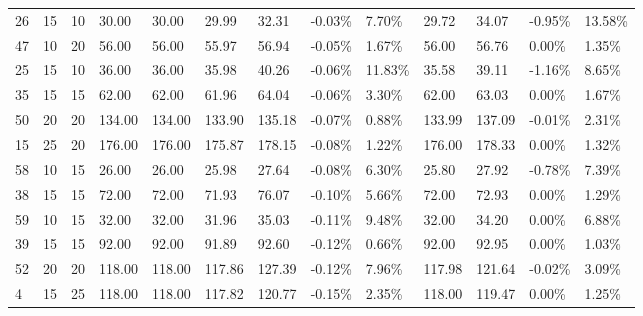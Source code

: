 \begin{longtable}{l|ll|ll|llll|llll}
  26 & 15                         & 10                         & 30.00                     & 30.00         & 29.99  & 32.31  & -0.03\% & 7.70\%  & 29.72  & 34.07  & -0.95\% & 13.58\% \\
  47 & 10                         & 20                         & 56.00                     & 56.00         & 55.97  & 56.94  & -0.05\% & 1.67\%  & 56.00  & 56.76  & 0.00\%  & 1.35\%  \\
  25 & 15                         & 10                         & 36.00                     & 36.00         & 35.98  & 40.26  & -0.06\% & 11.83\% & 35.58  & 39.11  & -1.16\% & 8.65\%  \\
  35 & 15                         & 15                         & 62.00                     & 62.00         & 61.96  & 64.04  & -0.06\% & 3.30\%  & 62.00  & 63.03  & 0.00\%  & 1.67\%  \\
  50 & 20                         & 20                         & 134.00                    & 134.00        & 133.90 & 135.18 & -0.07\% & 0.88\%  & 133.99 & 137.09 & -0.01\% & 2.31\%  \\
  15 & 25                         & 20                         & 176.00                    & 176.00        & 175.87 & 178.15 & -0.08\% & 1.22\%  & 176.00 & 178.33 & 0.00\%  & 1.32\%  \\
  58 & 10                         & 15                         & 26.00                     & 26.00         & 25.98  & 27.64  & -0.08\% & 6.30\%  & 25.80  & 27.92  & -0.78\% & 7.39\%  \\
  38 & 15                         & 15                         & 72.00                     & 72.00         & 71.93  & 76.07  & -0.10\% & 5.66\%  & 72.00  & 72.93  & 0.00\%  & 1.29\%  \\
  59 & 10                         & 15                         & 32.00                     & 32.00         & 31.96  & 35.03  & -0.11\% & 9.48\%  & 32.00  & 34.20  & 0.00\%  & 6.88\%  \\
  39 & 15                         & 15                         & 92.00                     & 92.00         & 91.89  & 92.60  & -0.12\% & 0.66\%  & 92.00  & 92.95  & 0.00\%  & 1.03\%  \\
  52 & 20                         & 20                         & 118.00                    & 118.00        & 117.86 & 127.39 & -0.12\% & 7.96\%  & 117.98 & 121.64 & -0.02\% & 3.09\%  \\
  4  & 15                         & 25                         & 118.00                    & 118.00        & 117.82 & 120.77 & -0.15\% & 2.35\%  & 118.00 & 119.47 & 0.00\%  & 1.25\%  \\

\end{longtable}

